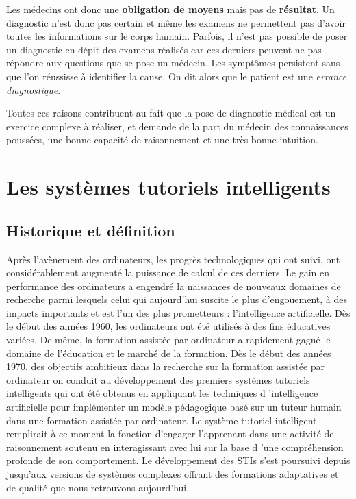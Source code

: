 Les médecins ont donc une \textbf{obligation de moyens} mais pas de \textbf{résultat}. Un diagnostic n'est donc pas certain et même les examens ne permettent pas d'avoir toutes les informations sur le corps humain. Parfois, il n'est pas possible de poser un diagnostic en dépit des examens réalisés car ces derniers peuvent ne pas répondre aux questions que se pose un médecin. Les symptômes persistent sans que l'on réussisse à identifier la cause. On dit alors que le patient est une \textit{errance diagnostique}.

Toutes ces raisons contribuent au fait que la pose de diagnostic médical est un exercice complexe à réaliser, et demande de la part du médecin des connaissances poussées, une bonne capacité de raisonnement et une très bonne intuition.

\newpage

\section{Les systèmes tutoriels intelligents}

\subsection{Historique et définition}

Après l'avènement des ordinateurs, les progrès technologiques qui ont suivi, ont considérablement augmenté la puissance de calcul de ces derniers. Le gain en performance des ordinateurs a engendré la naissances de nouveaux domaines de recherche parmi lesquels celui qui aujourd'hui suscite le plus d'engouement, à des impacts importants et est l'un des plus prometteurs : l'intelligence artificielle. Dès le début des années 1960, les ordinateurs ont été utilisés à des fins éducatives variées. De même, la formation assistée par ordinateur a rapidement gagné le domaine de l'éducation et le marché de la formation. Dès le début des années 1970, des objectifs ambitieux dans la recherche sur la formation assistée par ordinateur on conduit au développement des premiers systèmes tutoriels intelligents qui ont été obtenus en appliquant les techniques d 'intelligence artificielle pour implémenter un modèle pédagogique basé sur un tuteur humain dans une
formation assistée par ordinateur. Le système tutoriel intelligent remplirait à ce moment la fonction d'engager l'apprenant dans une activité de raisonnement soutenu en interagissant avec lui sur la base d 'une compréhension profonde de son comportement. Le développement des STIs s'est poursuivi depuis jusqu'aux versions de systèmes complexes offrant des formations adaptatives et de qualité que nous retrouvons aujourd'hui.


